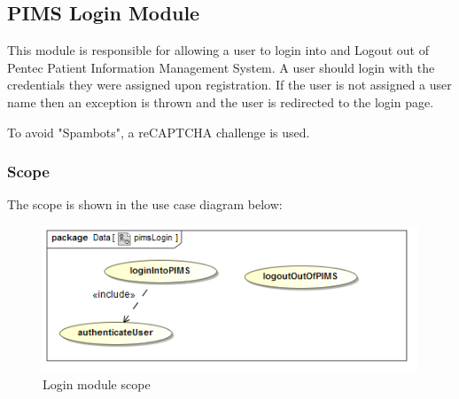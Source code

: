 \subsection{PIMS Login Module}
This module is responsible for allowing a user to login into and Logout out of Pentec Patient Information Management System. A user should login with the credentials they were assigned upon registration. If the user is not assigned a user name then an exception is thrown and the user is redirected to the login page. \par 

To avoid "Spambots", a reCAPTCHA challenge is used. 

\subsubsection{Scope}
The scope is shown in the use case diagram below: \par
\begin{figure}[H]
	\centerline{\includegraphics[width=0.75\linewidth]{./Functional_Requirements/Graphics/pimsLogin/pimsLogin}}
	\caption{Login module scope}
\end{figure}

